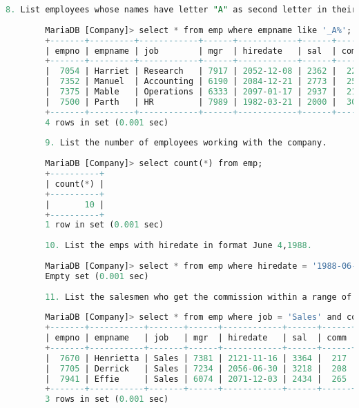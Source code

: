 \documentclass{article}
\begin{document}
\begin{lstlisting}[language=SQL]
		8. List employees whose names have letter "A" as second letter in their names. 
		
		MariaDB [Company]> select * from emp where empname like '_A%'; 
		+-------+---------+------------+------+------------+------+------+--------+ 
		| empno | empname | job        | mgr  | hiredate   | sal  | comm | deptno | 
		+-------+---------+------------+------+------------+------+------+--------+ 
		|  7054 | Harriet | Research   | 7917 | 2052-12-08 | 2362 |  229 |     20 | 
		|  7352 | Manuel  | Accounting | 6190 | 2084-12-21 | 2773 |  253 |     10 | 
		|  7375 | Mable   | Operations | 6333 | 2097-01-17 | 2937 |  210 |     40 | 
		|  7500 | Parth   | HR         | 7989 | 1982-03-21 | 2000 |  300 |     60 | 
		+-------+---------+------------+------+------------+------+------+--------+ 
		4 rows in set (0.001 sec) 
		
		9. List the number of employees working with the company. 
		
		MariaDB [Company]> select count(*) from emp; 
		+----------+ 
		| count(*) | 
		+----------+ 
		|       10 | 
		+----------+ 
		1 row in set (0.001 sec) 
		
		10. List the emps with hiredate in format June 4,1988. 
		
		MariaDB [Company]> select * from emp where hiredate = '1988-06-04'; 
		Empty set (0.001 sec) 
		
		11. List the salesmen who get the commission within a range of 200 and 5000. 
		
		MariaDB [Company]> select * from emp where job = 'Sales' and comm between 200 and 5000; 
		+-------+-----------+-------+------+------------+------+------+--------+ 
		| empno | empname   | job   | mgr  | hiredate   | sal  | comm | deptno | 
		+-------+-----------+-------+------+------------+------+------+--------+ 
		|  7670 | Henrietta | Sales | 7381 | 2121-11-16 | 3364 |  217 |     30 | 
		|  7705 | Derrick   | Sales | 7234 | 2056-06-30 | 3218 |  208 |     30 | 
		|  7941 | Effie     | Sales | 6074 | 2071-12-03 | 2434 |  265 |     30 | 
		+-------+-----------+-------+------+------------+------+------+--------+ 
		3 rows in set (0.001 sec) 
		
	\end{lstlisting} 
	
\end{document}
